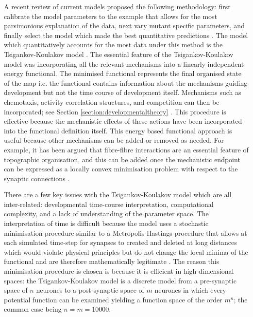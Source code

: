 A recent review of current models proposed the following methodology: first calibrate the model parameters to the example that allows for the most parsimonious explanation of the data, next vary mutant specific parameters, and finally select the model which made the best quantitative predictions \cite{Hjorth2015-le}. The model which quantitatively accounts for the most data under this method is the Tsigankov-Koulakov model \cite{Tsigankov2006-uy, Triplett2011-jk}. The essential feature of the Tsigankov-Koulakov model was incorporating all the relevant mechanisms into a linearly independent energy functional. The minimised functional represents the final organised state of the map i.e. the functional contains information about the mechanisms guiding development but not the time course of development itself. Mechanisms such as chemotaxis, activity correlation structures, and competition can then be incorporated; see Section \ref{section:developmentaltheory} \cite{Seabrook2017-fa, Lemke2005-iz, Triplett2011-jk, Cang2013-dw}. This procedure is effective because the mechanistic effects of these actions have been incorporated into the functional definition itself. This energy based functional approach is useful because other mechanisms can be added or removed as needed. For example, it has been argued that fibre-fibre interactions are an essential feature of topographic organisation, and this can be added once the mechanistic endpoint can be expressed as a locally convex minimisation problem with respect to the synaptic connections \cite{Weth2014-dq}. 

There are a few key issues with the Tsigankov-Koulakov model which are all inter-related: developmental time-course interpretation, computational complexity, and a lack of understanding of the parameter space. The interpretation of time is difficult because the model uses a stochastic minimisation procedure similar to a Metropolis-Hastings procedure that allows at each simulated time-step for synapses to created and deleted at long distances which would violate physical principles but do not change the local minima of the functional and are therefore mathematically legitimate \cite{William_H_Press2007-kb}. The reason this minimisation procedure is chosen is because it is efficient in high-dimensional spaces: the Tsigankov-Koulakov model is a discrete model from a pre-synaptic space of $n$ neurones to a post-synaptic space of $m$ neurones in which every potential function can be examined yielding a function space of the order $m^n$; the common case being $n=m=10000$. 

